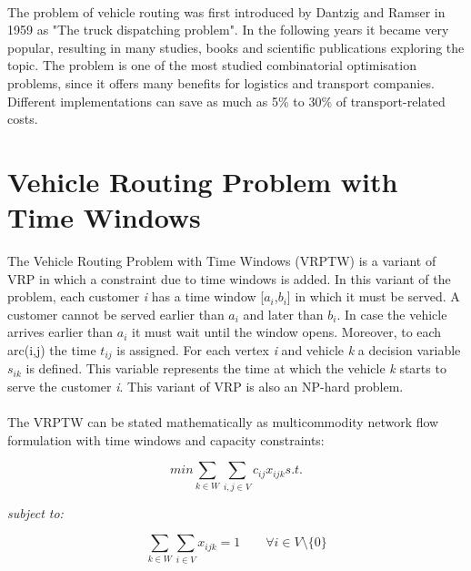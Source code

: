 \documentclass[a4paper,twoside,12pt]{book}
\begin{document}
\paragraph{}
The problem of vehicle routing was first introduced by Dantzig and Ramser in 1959 as "The truck dispatching problem". \cite{bib:article:TruckDispatching} In the following years it became very popular, resulting in many studies, books and scientific publications exploring the topic. The problem is one of the most studied combinatorial optimisation problems, since it offers many benefits for logistics and transport companies. Different implementations can save as much as 5\% to 30\% of transport-related costs. \cite{bib:book:GeometricModellingCostSavings}

\section{Vehicle Routing Problem with Time Windows}

The Vehicle Routing Problem with Time Windows (VRPTW) is a variant of VRP in which a constraint due to time windows is added. In this variant of the problem, each customer \textit{i} has a time window [$a_{i}$,$b_{i}$] in which it must be served. A customer cannot be served earlier than $a_{i}$ and later than $b_{i}$. In case the vehicle arrives earlier than $a_{i}$ it must wait until the window opens. Moreover, to each arc(i,j) the time \textit{$t_{ij}$} is assigned. For each vertex \textit{i} and vehicle \textit{k} a decision variable \textit{$s_{ik}$} is defined. This variable represents the time at which the vehicle \textit{k} starts to serve the customer \textit{i}. \cite{bib:chapter:VRPTW}
This variant of VRP is also an NP-hard problem. \cite{bib:article:Savelsbergh}
\paragraph{}
The VRPTW can be stated mathematically as multicommodity network flow formulation with time windows and capacity constraints:\cite{bib:chapter:VRPTW} 

\begin{equation}
min \sum_{k \in W}\sum_{i,j \in V} c_{ij}x_{ijk} s.t.
\end{equation}

\textit{subject to:}

\begin{equation}
\sum_{k \in W}\sum_{i \in V}x_{ijk} = 1 \qquad \forall i \in V \setminus \lbrace 0 \rbrace
\end{equation}
\end{document}
